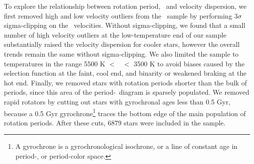 To explore the relationship between rotation period, \teff\ and velocity
dispersion, we first removed high and low velocity outliers from the \mct\
sample by performing 3$\sigma$ sigma-clipping on the \vb\ velocities.
Without sigma-clipping, we found that a small number of high velocity
outliers at the low-temperature end of our sample substantially raised the
velocity dispersion for cooler stars, however the overall trends remain the
same without sigma-clipping.
We also limited the sample to temperatures in the range 5500 K $<$ \teff\ $<$
3500 K to avoid biases caused by the selection function at the faint, cool
end, and binarity or weakened braking \citep{vansaders2016} at the hot end.
Finally, we removed stars with rotation periods shorter than the bulk of
periods, since this area of the period-\teff\ diagram is sparsely populated.
We removed rapid rotators by cutting out stars with gyrochronal ages less than
0.5 Gyr, because a 0.5 Gyr gyrochrone\footnote{A gyrochrone is a
gyrochronological isochrone, or a line of constant age in period-\teff, or
period-color space.} traces the bottom edge of the main population of rotation
periods.
After these cuts, 6879 stars were included in the sample.

